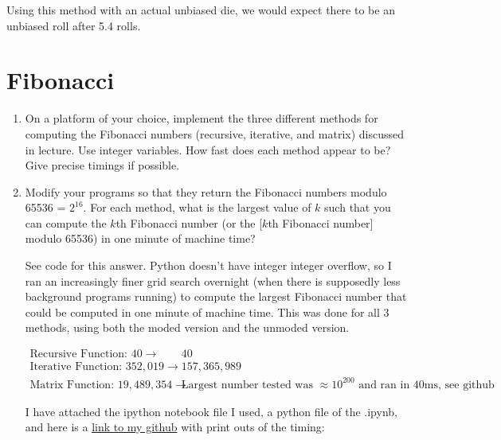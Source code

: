 \documentclass[11pt]{article}
\begin{document}
\begin{enumerate}
\begin{adjustwidth}{.5cm}{}
    Using this method with an actual unbiased die, we would expect there to be an unbiased roll after 5.4 rolls. 
    
\end{adjustwidth}

\end{enumerate}

\section*{Fibonacci}

\begin{enumerate}

\item On a platform of your choice, implement the three different
methods for computing the Fibonacci numbers (recursive, iterative, and
matrix) discussed in lecture.  Use integer variables.  How fast does
each method appear to be?  Give precise timings if possible.

\item Modify your programs so that they return the Fibonacci
numbers modulo 65536 = $2^{16}$.  For each
method, what is the largest value of $k$ such that you can compute the $k$th Fibonacci number 
(or the [$k$th Fibonacci number] modulo 65536) in one minute of machine time?  

\begin{adjustwidth}{.5cm}{}
    See code for this answer.  Python doesn't have integer integer overflow, so I ran an increasingly finer grid search overnight (when there is supposedly less background programs running) to compute the largest Fibonacci number that could be computed in one minute of machine time.  This was done for all 3 methods, using both the moded version and the unmoded version.
    
    \begin{align*}
        \text{Recursive Function: } 40 \rightarrow& 40 \\
        \text{Iterative Function: } 352,019 \rightarrow& 157,365,989 \\
        \text{Matrix Function: } 19,489,354 \rightarrow& \text{Largest number tested was $\approx10^{200}$ and ran in 40ms, see github}
    \end{align*}

    I have attached the ipython notebook file I used, a python file of the .ipynb, and here is a \href{https://github.com/cpenalobel/sportsdata/blob/master/cs_124/Homework%201.ipynb}{link to my github} with print outs of the timing: 
\end{adjustwidth}

\end{enumerate}
\end{document}
